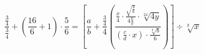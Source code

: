 \documentclass[12pt]{article}
\begin{document}
$$\frac{\frac{3}{4}} {\frac{3}{4}} + \left(\frac{16}{6}+1\right)\cdot \frac{5}{6}=
\left [\frac{a}{b}+\frac{\frac{3}{4}}{4}
\left ( \frac{\frac{x}{4}\cdot \frac{\sqrt{\frac{4}{6}}}{4\frac{6}{g}}\cdot \sqrt[2x]{4y}}
{\left ( \frac{c}{d}\cdot x \right )\cdot \frac{\sqrt[d]{b}}{6}} \right ) \right]\div \sqrt[y]{x}$$
\end{document}
